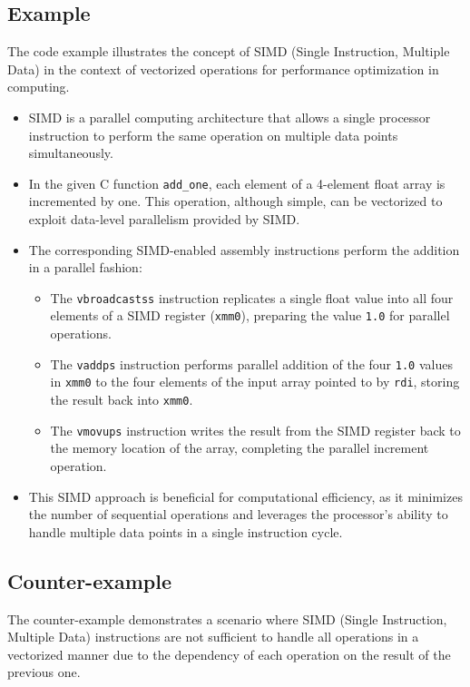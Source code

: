 \documentclass[12pt]{article}
\begin{document}
\subsection{Example}

The code example illustrates the concept of SIMD (Single Instruction, Multiple Data) in the context of vectorized operations for performance optimization in computing.

\begin{itemize}
    \item SIMD is a parallel computing architecture that allows a single processor instruction to perform the same operation on multiple data points simultaneously.
    \item In the given C function \texttt{add\_one}, each element of a 4-element float array is incremented by one. This operation, although simple, can be vectorized to exploit data-level parallelism provided by SIMD.
    \item The corresponding SIMD-enabled assembly instructions perform the addition in a parallel fashion:
    \begin{itemize}
        \item The \texttt{vbroadcastss} instruction replicates a single float value into all four elements of a SIMD register (\texttt{xmm0}), preparing the value \texttt{1.0} for parallel operations.
        \item The \texttt{vaddps} instruction performs parallel addition of the four \texttt{1.0} values in \texttt{xmm0} to the four elements of the input array pointed to by \texttt{rdi}, storing the result back into \texttt{xmm0}.
        \item The \texttt{vmovups} instruction writes the result from the SIMD register back to the memory location of the array, completing the parallel increment operation.
    \end{itemize}
    \item This SIMD approach is beneficial for computational efficiency, as it minimizes the number of sequential operations and leverages the processor's ability to handle multiple data points in a single instruction cycle.
\end{itemize}

\subsection{Counter-example}

The counter-example demonstrates a scenario where SIMD (Single Instruction, Multiple Data) instructions are not sufficient to handle all operations in a vectorized manner due to the dependency of each operation on the result of the previous one.
\end{document}
